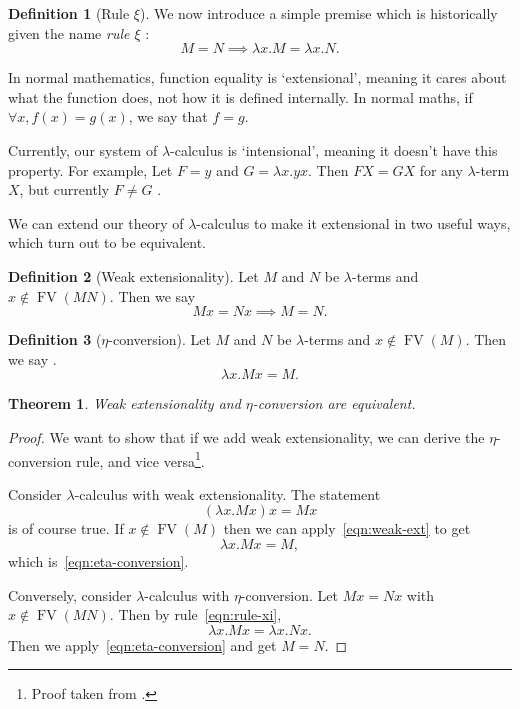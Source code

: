 \documentclass[a4paper, 11pt]{article}
\theoremstyle{plain}
\newtheorem{thm}{Theorem}[section]
\theoremstyle{definition}
\newtheorem{defn}{Definition}[section]
\theoremstyle{remark}
\newcommand\FV{\operatorname{FV}}
\begin{document}
\begin{defn}[Rule $\xi$]\label{def:rule-xi}
We now introduce a simple premise which is historically given the name \textit{rule $\xi$} \parencites[p.~23]{barendregt-1981-lambda-calculus}[p.~70]{hindley-seldin-2008-lambda-calculus-and-combinators}:
\begin{equation}\label{eqn:rule-xi}
M = N \implies \lambda x . M = \lambda x . N. \tag{\xi}
\end{equation}
\end{defn}

In normal mathematics, function equality is `extensional', meaning it cares about what the function does, not how it is defined internally. In normal maths, if $\forall x, f(x) = g(x)$, we say that $f = g$.

Currently, our system of $\lambda$-calculus is `intensional', meaning it doesn't have this property. For example, Let $F = y$ and $G = \lambda x . y x$. Then $F X = G X$ for any $\lambda$-term $X$, but currently $F \ne G$ \parencite[p.~76]{hindley-seldin-2008-lambda-calculus-and-combinators}.

We can extend our theory of $\lambda$-calculus to make it extensional in two useful ways, which turn out to be equivalent.

\begin{defn}[Weak extensionality]
Let $M$ and $N$ be $\lambda$-terms and $x \notin \FV(MN)$. Then we say \parencite[p.~31]{barendregt-1981-lambda-calculus}
\begin{equation}\label{eqn:weak-ext}
Mx = Nx \implies M = N. \tag{\zeta}
\end{equation}
\end{defn}

\begin{defn}[$\eta$-conversion]\label{def:eta-conversion}
Let $M$ and $N$ be $\lambda$-terms and $x \notin \FV(M)$. Then we say \parencite[p.~32]{barendregt-1981-lambda-calculus}.
\begin{equation}\label{eqn:eta-conversion}
\lambda x . M x = M. \tag{\eta}
\end{equation}
\end{defn}

\begin{thm}\label{thm:weak-ext-and-eta-conv-equiv}
Weak extensionality and $\eta$-conversion are equivalent.
\end{thm}

\begin{proof}
We want to show that if we add weak extensionality, we can derive the $\eta$-conversion rule, and vice versa\footnote{Proof taken from \parencite[p.~32]{barendregt-1981-lambda-calculus}.}.

Consider $\lambda$-calculus with weak extensionality. The statement \[
(\lambda x . M x) x = M x
\] is of course true. If $x \notin \FV(M)$ then we can apply~\eqref{eqn:weak-ext} to get \[
\lambda x . M x = M,
\] which is~\eqref{eqn:eta-conversion}.

Conversely, consider $\lambda$-calculus with $\eta$-conversion. Let $Mx = Nx$ with $x \notin \FV(MN)$. Then by rule~\ref{eqn:rule-xi}, \[
\lambda x . Mx = \lambda x . Nx.
\] Then we apply~\eqref{eqn:eta-conversion} and get $M = N$.
\end{proof}
\end{document}
